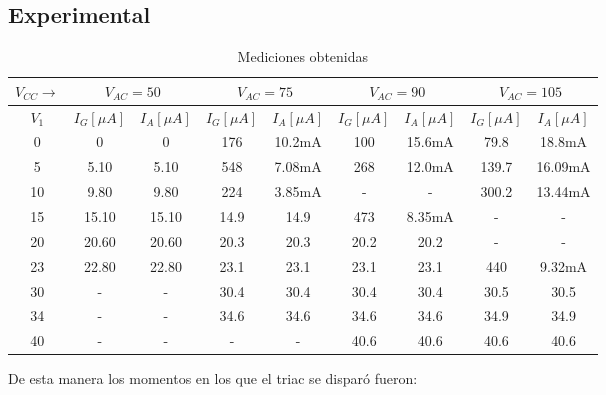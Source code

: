 \subsection{Experimental}
\begin{table}[H]
  \begin{center}
    \begin{tabular}{|c|c|c|c|c|c|c|c|c|}
      \hline
      $V_{CC}\rightarrow $&\multicolumn{2}{|c|}{$V_{AC}=50$} &\multicolumn{2}{c|}{$V_{AC}=75$} &\multicolumn{2}{c|}{$V_{AC}=90$} &\multicolumn{2}{c|}{$V_{AC}=105$}\\ 
      \hline
      \hline
      $V_{1}$ &$I_G[\mu A]$ &$I_A[\mu A]$  &$I_G[\mu A]$ &$I_A[\mu A]$  &$I_G[\mu A]$ &$I_A[\mu A]$  &$I_G[\mu A]$ &$I_A[\mu A]$\\ 
      \hline
      0    &0     &0       &176    &10.2mA &100   &15.6mA  &79.8    &18.8mA    \\
      5    &5.10  &5.10    &548    &7.08mA &268   &12.0mA  &139.7   &16.09mA   \\
      10   &9.80  &9.80    &224    &3.85mA &-     &-       &300.2   &13.44mA   \\
      15   &15.10 &15.10   &14.9   &14.9   &473   &8.35mA  &-       &-        \\
      20   &20.60 &20.60   &20.3   &20.3   &20.2  &20.2    &-       &-        \\
      23   &22.80 &22.80   &23.1   &23.1   &23.1  &23.1    &440     &9.32mA    \\
      30   &-     &-       &30.4   &30.4   &30.4  &30.4    &30.5    &30.5    \\
      34   &-     &-       &34.6   &34.6   &34.6  &34.6    &34.9    &34.9    \\
      40   &-     &-       &-       &-     &40.6  &40.6    &40.6    &40.6    \\
            \hline
    \end{tabular}
  \end{center}
  \caption{Mediciones obtenidas}
\end{table}
De esta manera los momentos en los que el triac se disparó fueron:
